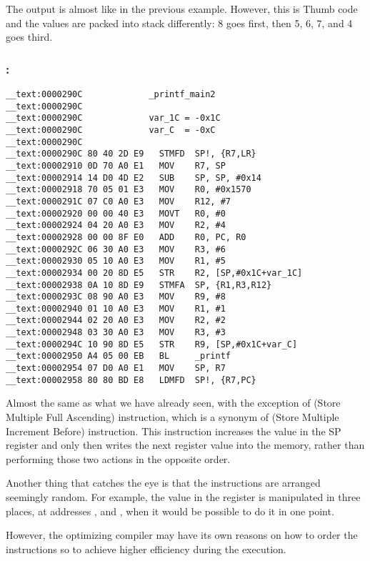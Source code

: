 The output is almost like in the previous example. However, this is Thumb code and the values are packed into stack differently: 
8 goes first, then 5, 6, 7, and 4 goes third.

\subsubsection{\OptimizingXcodeIV: \ARMMode}

\begin{lstlisting}
__text:0000290C             _printf_main2
__text:0000290C
__text:0000290C             var_1C = -0x1C
__text:0000290C             var_C  = -0xC
__text:0000290C
__text:0000290C 80 40 2D E9   STMFD  SP!, {R7,LR}
__text:00002910 0D 70 A0 E1   MOV    R7, SP
__text:00002914 14 D0 4D E2   SUB    SP, SP, #0x14
__text:00002918 70 05 01 E3   MOV    R0, #0x1570
__text:0000291C 07 C0 A0 E3   MOV    R12, #7
__text:00002920 00 00 40 E3   MOVT   R0, #0
__text:00002924 04 20 A0 E3   MOV    R2, #4
__text:00002928 00 00 8F E0   ADD    R0, PC, R0
__text:0000292C 06 30 A0 E3   MOV    R3, #6
__text:00002930 05 10 A0 E3   MOV    R1, #5
__text:00002934 00 20 8D E5   STR    R2, [SP,#0x1C+var_1C]
__text:00002938 0A 10 8D E9   STMFA  SP, {R1,R3,R12}
__text:0000293C 08 90 A0 E3   MOV    R9, #8
__text:00002940 01 10 A0 E3   MOV    R1, #1
__text:00002944 02 20 A0 E3   MOV    R2, #2
__text:00002948 03 30 A0 E3   MOV    R3, #3
__text:0000294C 10 90 8D E5   STR    R9, [SP,#0x1C+var_C]
__text:00002950 A4 05 00 EB   BL     _printf
__text:00002954 07 D0 A0 E1   MOV    SP, R7
__text:00002958 80 80 BD E8   LDMFD  SP!, {R7,PC}
\end{lstlisting}

Almost the same as what we have already seen, with the
exception of  (Store Multiple Full Ascending) instruction, which is a synonym of  (Store Multiple Increment Before) instruction. 
This instruction increases the value in the \ac{SP} register and only then writes the next register value into the memory, rather than performing those two actions in the opposite order.

Another thing that catches the eye is that the instructions are arranged seemingly random.
For example, the value in the  register is manipulated in three
places, at addresses ,  and , when it would be possible to do it in one point.

However, the optimizing compiler may have its own reasons on how to order the instructions so to achieve higher efficiency during the execution.


